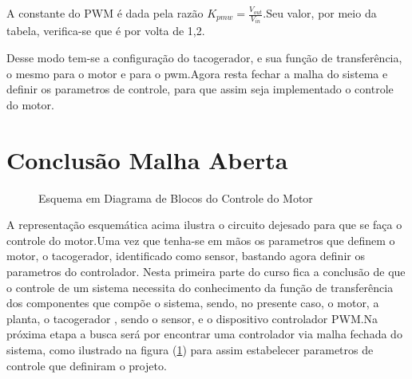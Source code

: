 \documentclass[11pt, a4paper, oneside]{article}
\begin{document}
A constante do PWM é dada pela razão $K_{pmw}=\frac{V_{out}}{V_{in}}$.Seu valor, por meio da tabela, verifica-se que é por volta de 1,2.

Desse modo tem-se a configuração do tacogerador, e sua função de transferência, o mesmo para o motor e para o pwm.Agora resta fechar a malha do sistema e definir os parametros de controle, para que assim seja implementado o controle do motor.

\section{Conclusão Malha Aberta}  
\begin{figure}[h!]
\centering
{}
\caption{Esquema em Diagrama de Blocos do Controle do Motor}
\label{malha fechada}
\end{figure}  
        
A representação esquemática acima ilustra o circuito dejesado para que se faça  o controle do motor.Uma vez que tenha-se em mãos os parametros que definem o motor, o tacogerador, identificado como sensor, bastando agora definir os parametros do controlador.
Nesta primeira parte do curso fica a conclusão de que o controle de um sistema necessita do conhecimento da função de transferência dos componentes que compõe o sistema, sendo, no presente caso, o motor, a planta, o tacogerador , sendo o sensor, e o dispositivo controlador PWM.Na próxima etapa a busca será por encontrar uma controlador via malha fechada do sistema, como ilustrado na figura (\ref{malha fechada}) para assim estabelecer parametros de controle que definiram o projeto.
\end{document}
